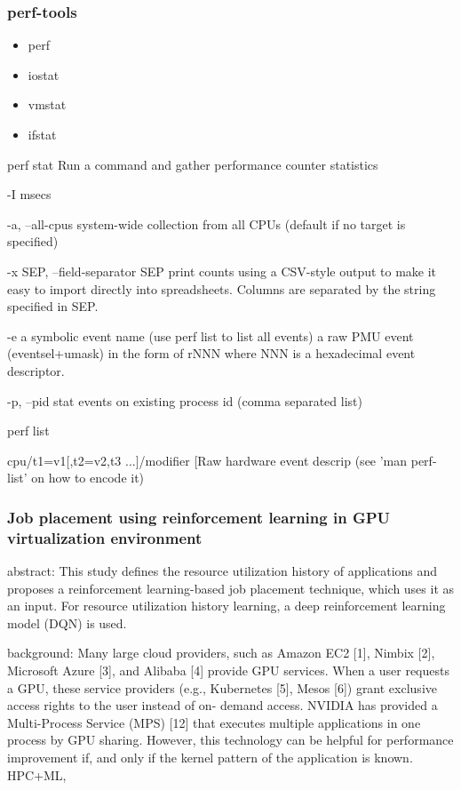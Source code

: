 \documentclass[UTF8]{article}
\begin{document}
\subsubsection{perf-tools}
\begin{itemize}
	\item perf
	\item iostat
	\item vmstat
	\item ifstat
\end{itemize}

perf stat Run a command and gather performance counter statistics

-I msecs

-a, --all-cpus system-wide collection from all CPUs (default if no target is
specified)

-x SEP, --field-separator SEP
print counts using a CSV-style output to make it easy to import directly into spreadsheets. Columns are
separated by the string specified in SEP.


-e a symbolic event name (use perf list to list all events) a raw PMU event (eventsel+umask) in the form of rNNN where NNN
is a hexadecimal event descriptor.

-p, --pid stat events on existing process id (comma separated list)

perf list

cpu/t1=v1[,t2=v2,t3 ...]/modifier                  [Raw hardware event descrip
(see 'man perf-list' on how to encode it)

\subsubsection{Job placement using reinforcement learning in GPU virtualization environment}

abstract: This study defines the resource utilization history of applications and proposes a reinforcement learning-based job placement technique, which uses it as an input. For resource utilization history learning, a deep reinforcement learning model (DQN) is used. 

background: Many large cloud providers, such as Amazon EC2 [1], Nimbix [2], Microsoft Azure [3], and Alibaba [4] provide GPU services. When a user requests a GPU, these service providers (e.g., Kubernetes [5], Mesos [6]) grant exclusive access rights to the user instead of on- demand access. NVIDIA has provided a Multi-Process Service (MPS) [12] that executes multiple applications in one process by GPU sharing. However, this technology can be helpful for performance improvement if, and only if the kernel pattern of the application is known. HPC+ML, 
\end{document}
